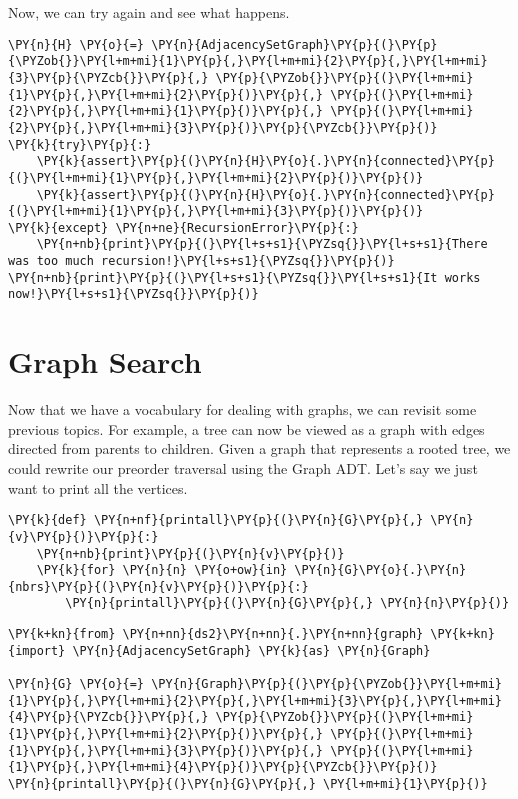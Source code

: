 Now, we can try again and see what happens.

\begin{Verbatim}[commandchars=\\\{\}]
\PY{n}{H} \PY{o}{=} \PY{n}{AdjacencySetGraph}\PY{p}{(}\PY{p}{\PYZob{}}\PY{l+m+mi}{1}\PY{p}{,}\PY{l+m+mi}{2}\PY{p}{,}\PY{l+m+mi}{3}\PY{p}{\PYZcb{}}\PY{p}{,} \PY{p}{\PYZob{}}\PY{p}{(}\PY{l+m+mi}{1}\PY{p}{,}\PY{l+m+mi}{2}\PY{p}{)}\PY{p}{,} \PY{p}{(}\PY{l+m+mi}{2}\PY{p}{,}\PY{l+m+mi}{1}\PY{p}{)}\PY{p}{,} \PY{p}{(}\PY{l+m+mi}{2}\PY{p}{,}\PY{l+m+mi}{3}\PY{p}{)}\PY{p}{\PYZcb{}}\PY{p}{)}
\PY{k}{try}\PY{p}{:}
    \PY{k}{assert}\PY{p}{(}\PY{n}{H}\PY{o}{.}\PY{n}{connected}\PY{p}{(}\PY{l+m+mi}{1}\PY{p}{,}\PY{l+m+mi}{2}\PY{p}{)}\PY{p}{)}
    \PY{k}{assert}\PY{p}{(}\PY{n}{H}\PY{o}{.}\PY{n}{connected}\PY{p}{(}\PY{l+m+mi}{1}\PY{p}{,}\PY{l+m+mi}{3}\PY{p}{)}\PY{p}{)}
\PY{k}{except} \PY{n+ne}{RecursionError}\PY{p}{:}
    \PY{n+nb}{print}\PY{p}{(}\PY{l+s+s1}{\PYZsq{}}\PY{l+s+s1}{There was too much recursion!}\PY{l+s+s1}{\PYZsq{}}\PY{p}{)}
\PY{n+nb}{print}\PY{p}{(}\PY{l+s+s1}{\PYZsq{}}\PY{l+s+s1}{It works now!}\PY{l+s+s1}{\PYZsq{}}\PY{p}{)}
\end{Verbatim}


\chapter{Graph Search}


Now that we have a vocabulary for dealing with graphs, we can revisit some previous topics.
For example, a tree can now be viewed as a graph with edges directed from parents to children.
Given a graph that represents a rooted tree, we could rewrite our preorder traversal using the Graph ADT.
Let's say we just want to print all the vertices.

\begin{Verbatim}[commandchars=\\\{\}]
\PY{k}{def} \PY{n+nf}{printall}\PY{p}{(}\PY{n}{G}\PY{p}{,} \PY{n}{v}\PY{p}{)}\PY{p}{:}
    \PY{n+nb}{print}\PY{p}{(}\PY{n}{v}\PY{p}{)}
    \PY{k}{for} \PY{n}{n} \PY{o+ow}{in} \PY{n}{G}\PY{o}{.}\PY{n}{nbrs}\PY{p}{(}\PY{n}{v}\PY{p}{)}\PY{p}{:}
        \PY{n}{printall}\PY{p}{(}\PY{n}{G}\PY{p}{,} \PY{n}{n}\PY{p}{)}
\end{Verbatim}


\begin{Verbatim}[commandchars=\\\{\}]
\PY{k+kn}{from} \PY{n+nn}{ds2}\PY{n+nn}{.}\PY{n+nn}{graph} \PY{k+kn}{import} \PY{n}{AdjacencySetGraph} \PY{k}{as} \PY{n}{Graph}

\PY{n}{G} \PY{o}{=} \PY{n}{Graph}\PY{p}{(}\PY{p}{\PYZob{}}\PY{l+m+mi}{1}\PY{p}{,}\PY{l+m+mi}{2}\PY{p}{,}\PY{l+m+mi}{3}\PY{p}{,}\PY{l+m+mi}{4}\PY{p}{\PYZcb{}}\PY{p}{,} \PY{p}{\PYZob{}}\PY{p}{(}\PY{l+m+mi}{1}\PY{p}{,}\PY{l+m+mi}{2}\PY{p}{)}\PY{p}{,} \PY{p}{(}\PY{l+m+mi}{1}\PY{p}{,}\PY{l+m+mi}{3}\PY{p}{)}\PY{p}{,} \PY{p}{(}\PY{l+m+mi}{1}\PY{p}{,}\PY{l+m+mi}{4}\PY{p}{)}\PY{p}{\PYZcb{}}\PY{p}{)}
\PY{n}{printall}\PY{p}{(}\PY{n}{G}\PY{p}{,} \PY{l+m+mi}{1}\PY{p}{)}
\end{Verbatim}



